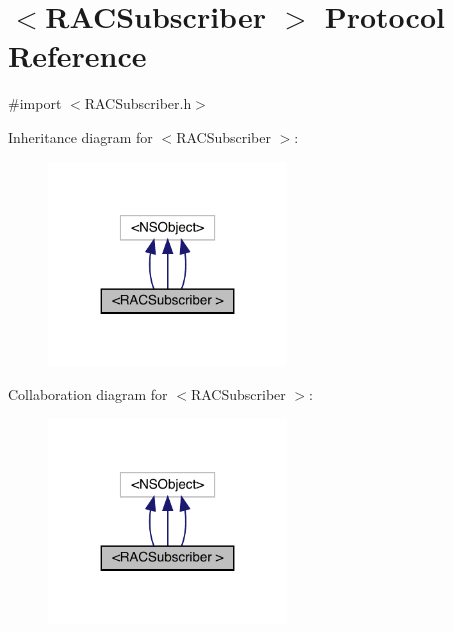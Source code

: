 \hypertarget{protocol_r_a_c_subscriber_01-p}{}\section{$<$R\+A\+C\+Subscriber $>$ Protocol Reference}
\label{protocol_r_a_c_subscriber_01-p}


{\ttfamily \#import $<$R\+A\+C\+Subscriber.\+h$>$}



Inheritance diagram for $<$R\+A\+C\+Subscriber $>$\+:\nopagebreak
\begin{figure}[H]
\begin{center}
\leavevmode
\includegraphics[width=179pt]{protocol_r_a_c_subscriber_01-p__inherit__graph}
\end{center}
\end{figure}


Collaboration diagram for $<$R\+A\+C\+Subscriber $>$\+:\nopagebreak
\begin{figure}[H]
\begin{center}
\leavevmode
\includegraphics[width=179pt]{protocol_r_a_c_subscriber_01-p__coll__graph}
\end{center}
\end{figure}
